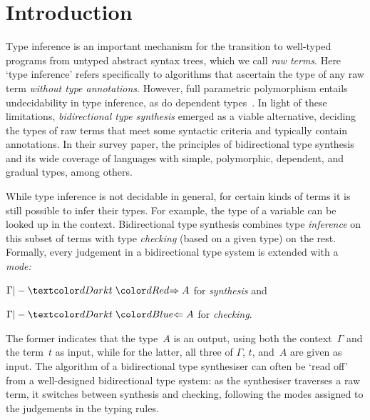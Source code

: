 
\section{Introduction}\label{sec:intro}

Type inference is an important mechanism for the transition to well-typed programs from untyped abstract syntax trees, which we call \emph{raw terms}.
Here `type inference' refers specifically to algorithms that ascertain the type of any raw term \emph{without type annotations}.
However, full parametric polymorphism entails undecidability in type inference, as do dependent types~\cite{Wells1999,Dowek1993}.
In light of these limitations, \emph{bidirectional type synthesis} emerged as a viable alternative, deciding the types of raw terms that meet some syntactic criteria and typically contain annotations.
In their survey paper,  the principles of bidirectional type synthesis and its wide coverage of languages with simple, polymorphic, dependent, and gradual types, among others.

While type inference is not decidable in general, for certain kinds of terms it is still possible to infer their types.
For example, the type of a variable can be looked up in the context.
Bidirectional type synthesis combines type \emph{inference} on this subset of terms with type \emph{checking} (based on a given type) on the rest.
Formally, every judgement in a bidirectional type system is extended with a \emph{mode:}
\begin{inlineenum}
  \item $\Gamma |- \isTerm{t} \syn A$ for \emph{synthesis} and 
  \item $\Gamma |- \isTerm{t} \chk A$ for \emph{checking}.
\end{inlineenum}
The former indicates that the type~$A$ is an output, using both the context~$\Gamma$ and the term~$t$ as input, while for the latter, all three of $\Gamma$, $t$, and~$A$ are given as input.
The algorithm of a bidirectional type synthesiser can often be `read off' from a well-designed bidirectional type system: as the synthesiser traverses a raw term, it switches between synthesis and checking, following the modes assigned to the judgements in the typing rules.

